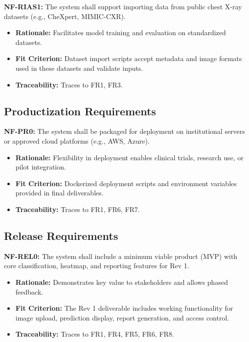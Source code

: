 \documentclass[12pt]{article}
\begin{document}
\textbf{NF-RIAS1:} The system shall support importing data from public chest X-ray datasets (e.g., CheXpert, MIMIC-CXR).
\begin{itemize}
    \item \textbf{Rationale:} Facilitates model training and evaluation on standardized datasets.
    \item \textbf{Fit Criterion:} Dataset import scripts accept metadata and image formats used in these datasets and validate inputs.
    \item \textbf{Traceability:} Traces to FR1, FR3.
\end{itemize}

\subsection{Productization Requirements}

\textbf{NF-PR0:} The system shall be packaged for deployment on institutional servers or approved cloud platforms (e.g., AWS, Azure).
\begin{itemize}
    \item \textbf{Rationale:} Flexibility in deployment enables clinical trials, research use, or pilot integration.
    \item \textbf{Fit Criterion:} Dockerized deployment scripts and environment variables provided in final deliverables.
    \item \textbf{Traceability:} Traces to FR1, FR6, FR7.
\end{itemize}

\subsection{Release Requirements}

\textbf{NF-REL0:} The system shall include a minimum viable product (MVP) with core classification, heatmap, and reporting features for Rev 1.
\begin{itemize}
    \item \textbf{Rationale:} Demonstrates key value to stakeholders and allows phased feedback.
    \item \textbf{Fit Criterion:} The Rev 1 deliverable includes working functionality for image upload, prediction display, report generation, and access control.
    \item \textbf{Traceability:} Traces to FR1, FR4, FR5, FR6, FR8.
\end{itemize}
\end{document}
